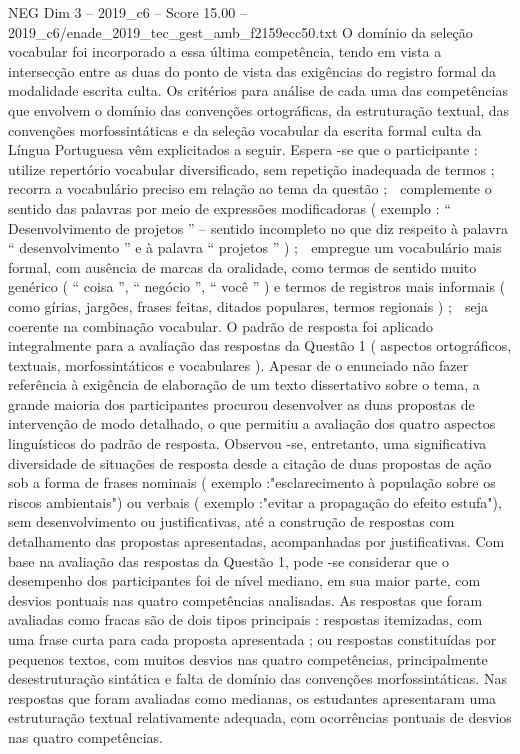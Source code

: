 \begin{textsample}{NEG Dim 3 – 2019\_c6 – Score 15.00 – 2019\_c6/enade\_2019\_tec\_gest\_amb\_f2159ecc50.txt}
O domínio da seleção vocabular foi incorporado a essa última competência, tendo em vista a intersecção entre as duas do ponto de vista das exigências do registro formal da modalidade escrita culta.
Os critérios para análise de cada uma das competências que envolvem o domínio das convenções ortográficas, da estruturação textual, das convenções morfossintáticas e da seleção vocabular da escrita formal culta da Língua Portuguesa vêm explicitados a seguir.
Espera -se que o participante :  utilize repertório vocabular diversificado, sem repetição inadequada de termos ;  recorra a vocabulário preciso em relação ao tema da questão ;  complemente o sentido das palavras por meio de expressões modificadoras ( exemplo : “ Desenvolvimento de projetos ” – sentido incompleto no que diz respeito à palavra “ desenvolvimento ” e à palavra “ projetos ” ) ;  empregue um vocabulário mais formal, com ausência de marcas da oralidade, como termos de sentido muito genérico ( “ coisa ”, “ negócio ”, “ você ” ) e termos de registros mais informais ( como gírias, jargões, frases feitas, ditados populares, termos regionais ) ;  seja coerente na combinação vocabular.
O padrão de resposta foi aplicado integralmente para a avaliação das respostas da Questão 1 ( aspectos ortográficos, textuais, morfossintáticos e vocabulares ).
Apesar de o enunciado não fazer referência à exigência de elaboração de um texto dissertativo sobre o tema, a grande maioria dos participantes procurou desenvolver as duas propostas de intervenção de modo detalhado, o que permitiu a avaliação dos quatro aspectos linguísticos do padrão de resposta.
Observou -se, entretanto, uma significativa diversidade de situações de resposta desde a citação de duas propostas de ação sob a forma de frases nominais ( exemplo :"esclarecimento à população sobre os riscos ambientais") ou verbais ( exemplo :"evitar a propagação do efeito estufa"), sem desenvolvimento ou justificativas, até a construção de respostas com detalhamento das propostas apresentadas, acompanhadas por justificativas.
Com base na avaliação das respostas da Questão 1, pode -se considerar que o desempenho dos participantes foi de nível mediano, em sua maior parte, com desvios pontuais nas quatro competências analisadas.
As respostas que foram avaliadas como fracas são de dois tipos principais : respostas itemizadas, com uma frase curta para cada proposta apresentada ; ou respostas constituídas por pequenos textos, com muitos desvios nas quatro competências, principalmente desestruturação sintática e falta de domínio das convenções morfossintáticas.
Nas respostas que foram avaliadas como medianas, os estudantes apresentaram uma estruturação textual relativamente adequada, com ocorrências pontuais de desvios nas quatro competências.

\end{textsample}
